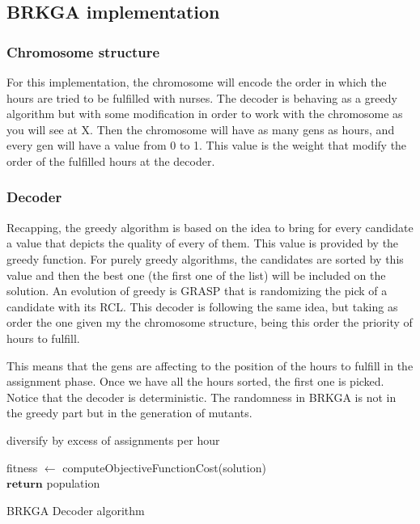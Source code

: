 \subsection{BRKGA implementation}

\subsubsection{Chromosome structure}

For this implementation, the chromosome will encode the order in which the hours are tried to be fulfilled with nurses. The decoder is behaving as a greedy algorithm but with some modification in order to work with the chromosome as you will see at X. Then the chromosome will have as many gens as hours, and every gen will have a value from 0 to 1. This value is the weight that modify the order of the fulfilled hours at the decoder.



\subsubsection{Decoder}

Recapping, the greedy algorithm is based on the idea to bring for every candidate a value that depicts the quality of every of them. This value is provided by the greedy function. For purely greedy algorithms, the candidates are sorted by this value and then the best one (the first one of the list) will be included on the solution. An evolution of greedy is GRASP that is randomizing the pick of a candidate with its RCL. This decoder is following the same idea, but taking as order the one given my the chromosome structure, being this order the priority of hours to fulfill.

This means that the gens are affecting to the position of the hours to fulfill in the assignment phase. Once we have all the hours sorted, the first one is picked. Notice that the decoder is deterministic. The randomness in BRKGA is not in the greedy part but in the generation of mutants.

diversify by excess of assignments per hour

\begin{algorithm}[H]


fitness $\leftarrow$ computeObjectiveFunctionCost(solution)\\
$\textbf{return}$ population
\caption{BRKGA Decoder algorithm}\label{alg.mainLoop}
\end{algorithm}


